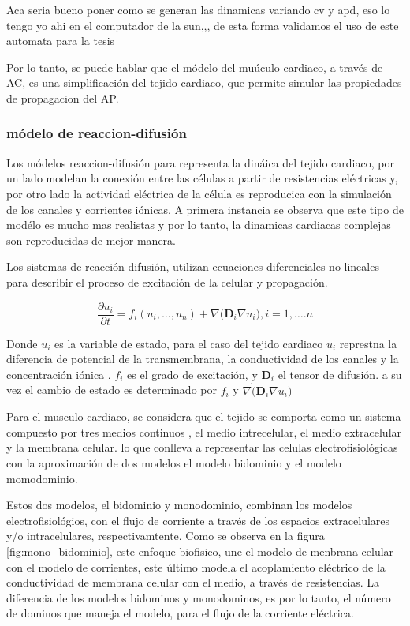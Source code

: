 Aca seria bueno poner como se generan las dinamicas variando cv y apd, eso lo
tengo yo ahi en el computador de la sun,,, de esta forma validamos el uso de
este automata para la tesis

Por lo tanto, se puede hablar que el módelo del muúculo cardiaco, a través de
\ac{AC}, es una simplificación del tejido cardiaco, que permite  simular las
propiedades de propagacion del \ac{AP}.


\subsubsection{módelo de reaccion-difusión}

Los módelos reaccion-difusión para representa la dináica del tejido cardiaco,
por un lado modelan la conexión  entre las células a partir de
resistencias eléctricas y, por otro lado la actividad eléctrica de la célula es
reproducica con la simulación de los canales  y corrientes iónicas. A primera
instancia se observa que este tipo de modélo es mucho mas realistas y por lo
tanto, la dinamicas cardiacas complejas son reproducidas de mejor manera.

Los sistemas de reacción-difusión, utilizan ecuaciones diferenciales no lineales
para describir el proceso de excitación de la celular y propagación.

\begin{equation}\label{eq:r-d}
\frac{\partial{u_i}}{\partial{t}}=f_i(u_i, \ldots,u_n) + \nabla \dot
(\mathbf{D}_i \nabla u_i), i=1,\ldots.n
\end{equation}

Donde $u_i$ es la variable de estado, para el caso del tejido cardiaco $u_i$
represtna la diferencia de potencial de la transmembrana, la conductividad de
los canales  y la concentración iónica \cite{Sachse04}. $f_i$ es el grado de excitación, y
$\mathbf{D}_i$ el tensor de difusión. a su vez el cambio de estado es
determinado por $f_i$ y $\nabla \dot(\mathbf{D}_i \nabla u_i)$

Para el musculo cardiaco, se considera que el tejido se comporta
como un sistema compuesto por tres medios continuos \cite{holden1997}, el medio
intrecelular, el medio extracelular y la membrana celular. lo que conlleva a
representar las celulas electrofisiológicas con la aproximación de dos modelos
el modelo bidominio y el modelo momodominio.


Estos dos modelos, el bidominio  y monodominio, combinan los
modelos electrofisiológios, con el flujo de corriente a través de los espacios
extracelulares y/o intracelulares, respectivamtente. Como se observa en la
figura \ref{fig:mono_bidominio}, este enfoque biofisico, une el modelo de
menbrana celular con el modelo de corrientes, este último modela el acoplamiento
eléctrico de la conductividad de membrana celular con el medio, a través de
resistencias. La diferencia de los modelos bidominos y monodominos, es por lo
tanto, el número de dominos que maneja el modelo, para el flujo de la corriente
eléctrica.

